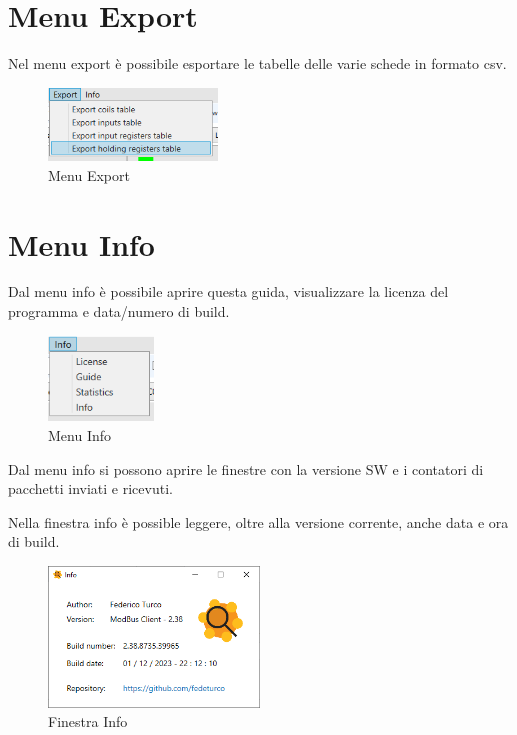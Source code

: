 \newpage
\section{Menu Export}

Nel menu export è possibile esportare le tabelle delle varie schede in formato csv.

\begin{figure}[H]
\centering
\includegraphics[width=0.4\textwidth]{../Img/Menu_Export.PNG}
\caption{Menu Export}
\end{figure}

\section{Menu Info}

Dal menu info è possibile aprire questa guida, visualizzare la licenza del programma e
data/numero di build.

\begin{figure}[H]
\centering
\includegraphics[width=0.25\textwidth]{../Img/Menu_Info.PNG}
\caption{Menu Info}
\end{figure}

Dal menu info si possono aprire le finestre con la versione SW 
e i contatori di pacchetti inviati e ricevuti.

\newpage

Nella finestra info è possible leggere, oltre alla versione corrente, anche data e ora di build.

\begin{figure}[H]
\centering
\includegraphics[width=0.5\textwidth]{../Img/Finestra_Info.PNG}
\caption{Finestra Info}
\end{figure}

